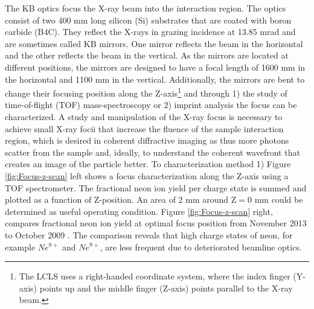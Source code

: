 The KB optics focus the X-ray beam into the interaction region. The optics consist of two 400 mm long silicon (Si) substrates that are coated with boron carbide (B4C). They reflect the X-rays in grazing incidence at 13.85 mrad and are sometimes called KB mirrors. One mirror reflects the beam in the horizontal and the other reflects the beam in the vertical. As the mirrors are located at different positions, the mirrors are designed to have a focal length of 1600 mm in the horizontal and 1100 mm in the vertical. Additionally, the mirrors are bent to change their focusing position along the Z-axis\footnote{The LCLS uses a right-handed coordinate system, where the index finger (Y-axis) points up and the middle finger (Z-axis) points parallel to the X-ray beam.} and through 1) the study of time-of-flight (TOF) mass-spectroscopy \citep{Bucher-2016-Unpublished} or 2) imprint analysis \citep{Hajkova-2011-SPIE,Chalupsky-2011-NIMPR} the focus can be characterized. A study and manipulation of the X-ray focus is necessary to achieve small X-ray focii that increase the fluence of the sample interaction region, which is desired in coherent diffractive imaging as thus more photons scatter from the sample and, ideally, to understand the coherent wavefront that creates an image of the particle better. To characterization method 1) Figure \ref{fig:Focus-z-scan} left shows a focus characterization along the Z-axis using a TOF spectrometer. The fractional neon ion yield per charge state is summed and plotted as a function of Z-position. An area of 2 mm around $\text{Z}=0$ mm could be determined as useful operating condition. Figure \ref{fig:Focus-z-scan} right, compares fractional neon ion yield at optimal focus position from November 2013 \citep{Bucher-2016-Unpublished} to October 2009 \citep{Doumy-2011-PRL}. The comparison reveals that high charge states of neon, for example $Ne^{8+}$ and $Ne^{9+}$, are less frequent due to deteriorated beamline optics.
